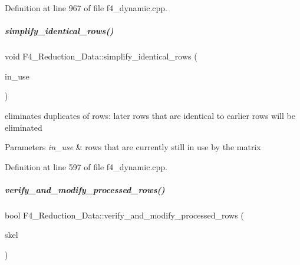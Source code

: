 Definition at line 967 of file f4\+\_\+dynamic.\+cpp.

\mbox{\label{group___g_b_computation_aa550a298a15a8baac59ced268331dc68}} 
\subparagraph{\texorpdfstring{simplify\+\_\+identical\+\_\+rows()}{simplify\_identical\_rows()}}
{\footnotesize\ttfamily void F4\+\_\+\+Reduction\+\_\+\+Data\+::simplify\+\_\+identical\+\_\+rows (\begin{DoxyParamCaption}\item[{set$<$ unsigned $>$ \&}]{in\+\_\+use }\end{DoxyParamCaption})}



eliminates duplicates of rows\+: later rows that are identical to earlier rows will be eliminated 


\begin{DoxyParams}{Parameters}
{\em in\+\_\+use} & rows that are currently still in use by the matrix \\
\hline
\end{DoxyParams}


Definition at line 597 of file f4\+\_\+dynamic.\+cpp.

\mbox{\label{group___g_b_computation_ad9808f644164e01195a2bcca7c3ca787}} 
\subparagraph{\texorpdfstring{verify\+\_\+and\+\_\+modify\+\_\+processed\+\_\+rows()}{verify\_and\_modify\_processed\_rows()}}
{\footnotesize\ttfamily bool F4\+\_\+\+Reduction\+\_\+\+Data\+::verify\+\_\+and\+\_\+modify\+\_\+processed\+\_\+rows (\begin{DoxyParamCaption}\item[{\hyperlink{group___c_l_s_solvers_class_l_p___solvers_1_1_l_p___solver}{L\+P\+\_\+\+Solver} $\ast$}]{skel }\end{DoxyParamCaption})}



